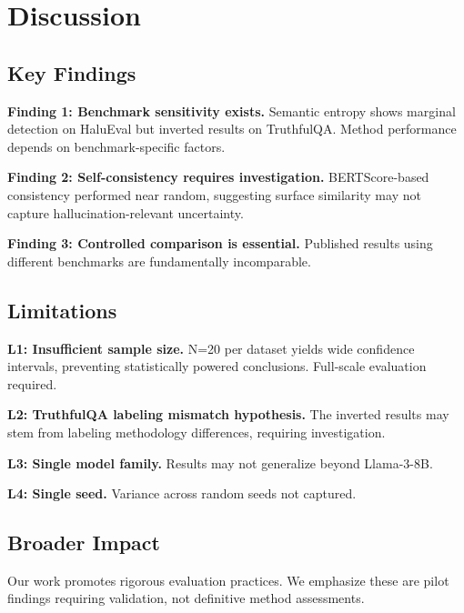 \section{Discussion}
\label{sec:discussion}

\subsection{Key Findings}

\textbf{Finding 1: Benchmark sensitivity exists.} Semantic entropy shows marginal detection on HaluEval but inverted results on TruthfulQA. Method performance depends on benchmark-specific factors.

\textbf{Finding 2: Self-consistency requires investigation.} BERTScore-based consistency performed near random, suggesting surface similarity may not capture hallucination-relevant uncertainty.

\textbf{Finding 3: Controlled comparison is essential.} Published results using different benchmarks are fundamentally incomparable.

\subsection{Limitations}

\textbf{L1: Insufficient sample size.} N=20 per dataset yields wide confidence intervals, preventing statistically powered conclusions. Full-scale evaluation required.

\textbf{L2: TruthfulQA labeling mismatch hypothesis.} The inverted results may stem from labeling methodology differences, requiring investigation.

\textbf{L3: Single model family.} Results may not generalize beyond Llama-3-8B.

\textbf{L4: Single seed.} Variance across random seeds not captured.

\subsection{Broader Impact}

Our work promotes rigorous evaluation practices. We emphasize these are pilot findings requiring validation, not definitive method assessments.
